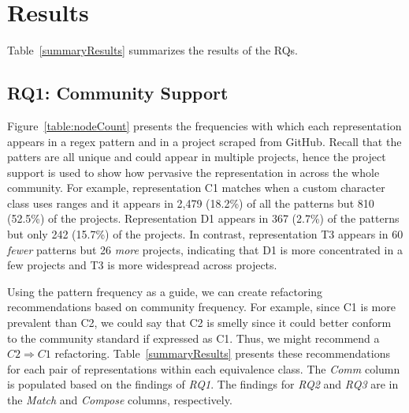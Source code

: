 
\section{Results}
\label{sec:results}
Table~\ref{summaryResults} summarizes the results of the RQs.  



\subsection{RQ1: Community Support}
Figure~\ref{table:nodeCount} presents the frequencies with which each representation appears in a regex pattern and in a project scraped from GitHub. Recall that the patters are all unique and could appear in multiple projects, hence the project support is used to show how pervasive the representation in across the whole community. For example, representation C1 matches when a custom character class uses ranges and it appears in 2,479 (18.2\%) of all the patterns but 810 (52.5\%) of the projects. Representation D1 appears in 367 (2.7\%) of the patterns but only 242 (15.7\%) of the projects. In contrast, representation T3 appears in 60 \emph{fewer} patterns but 26 \emph{more} projects, indicating that D1 is more concentrated in a few projects and T3 is more widespread across projects. 

Using the pattern frequency as a guide, we can create refactoring recommendations based on community frequency. For example, since C1 is more prevalent than C2, we could say that C2 is smelly since it could better conform to the community standard if expressed as C1. Thus, we might recommend a $C2 \Rightarrow C1$ refactoring. Table~\ref{summaryResults} presents these recommendations for each pair of representations within each equivalence class. The \emph{Comm} column is populated based on the findings of \emph{RQ1}. The findings for \emph{RQ2} and \emph{RQ3} are in the \emph{Match} and \emph{Compose} columns, respectively. 


